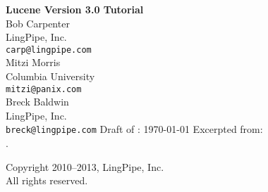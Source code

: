 \documentclass[10pt]{book}
\begin{document}
\frontmatter
\pagestyle{empty}
\vspace*{1in}
\noindent
{\Huge\bf Lucene Version 3.0 Tutorial}
\\[1in]
{\LARGE Bob Carpenter} 
\\[4pt] LingPipe, Inc.
\\[4pt] {\tt carp@lingpipe.com}
\\[16pt]
{\LARGE Mitzi Morris} 
\\[4pt] Columbia University
\\[4pt] {\tt mitzi@panix.com} 
\\[16pt]
{\LARGE Breck Baldwin} 
\\[4pt] LingPipe, Inc.
\\[4pt] {\tt breck@lingpipe.com} 
\hspace*{1in}
\vfill
{ }
\vfill
\noindent
Draft of : \today
\vfill
\noindent
Excerpted from:
\\[12pt]
\hspace*{-2pt}{\Large\it Text Processing with Java}.
\\[4pt]
%
\pagestyle{empty}
\clearpage
\hspace*{12pt}
\vfill
\begin{center}
{\small
Copyright 2010--2013, LingPipe, Inc.
\\
All rights reserved.}
\end{center}
\vfill
{}
\vfill
\pagestyle{empty}
\clearpage
\mainmatter
\pagestyle{fancy}

\end{document}
